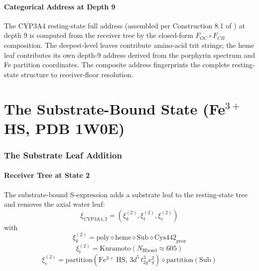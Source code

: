 \documentclass[11pt,twocolumn,a4paper]{article}
\theoremstyle{definition}
\theoremstyle{remark}
\newcommand{\Sexp}{\xi}
\begin{document}
\subsection{Categorical Address at Depth 9}

The CYP3A4 resting-state full address (assembled per Construction 8.1 of \citep{sachikonye2025_paper2}) at depth 9 is computed from the receiver tree by the closed-form $F_{OC} \circ F_{CB}$ composition. The deepest-level leaves contribute amino-acid trit strings; the heme leaf contributes its own depth-9 address derived from the porphyrin spectrum and Fe partition coordinates. The composite address fingerprints the complete resting-state structure to receiver-floor resolution.

\part{The Substrate-Bound State (Fe$^{3+}$ HS, PDB 1W0E)}

\section{The Substrate Leaf Addition}
\label{sec:substrate_tree}

\subsection{Receiver Tree at State 2}

The substrate-bound S-expression adds a substrate leaf to the resting-state tree and removes the axial water leaf:
\begin{equation}
\Sexp_{\mathrm{CYP3A4,2}} = (\Sexp_k^{(2)}, \Sexp_t^{(2)}, \Sexp_e^{(2)})
\end{equation}
with
\begin{equation}
\Sexp_k^{(2)} = \mathrm{poly} \diamond \mathrm{heme} \diamond \mathrm{Sub} \diamond \mathrm{Cys442}_{\mathrm{prox}}
\end{equation}
\begin{equation}
\Sexp_t^{(2)} = \mathrm{Kuramoto}(N_{\mathrm{Hbond}} \approx 605)
\end{equation}
\begin{equation}
\Sexp_e^{(2)} = \mathrm{partition}(\mathrm{Fe^{3+}\,HS},\,3d^5\,t_{2g}^3 e_g^2) \diamond \mathrm{partition}(\mathrm{Sub})
\end{equation}
\end{document}

